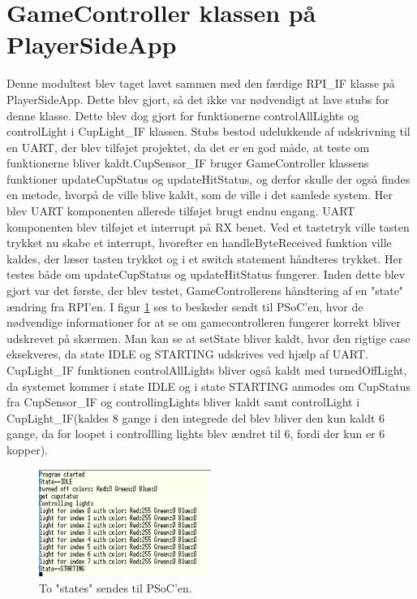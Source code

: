 \documentclass[Modultest/Modultest_main.tex]{subfiles}
\begin{document}
\section{GameController klassen på PlayerSideApp}\label{sec:GameController_modultest_bilag}
Denne modultest blev taget lavet sammen med den færdige RPI\_IF klasse på PlayerSideApp. Dette blev gjort, så det ikke var nødvendigt at lave stubs for denne klasse. Dette blev dog gjort for funktionerne controlAllLights og controlLight i CupLight\_IF klassen. Stubs bestod udelukkende af udskrivning til en UART, der blev tilføjet projektet, da det er en god måde, at teste om funktionerne bliver kaldt.CupSensor\_IF bruger GameController klassens funktioner updateCupStatus og updateHitStatus, og derfor skulle der også findes en metode, hvorpå de ville blive kaldt, som de ville i det samlede system. Her blev UART komponenten allerede tilføjet brugt endnu engang. UART komponenten blev tilføjet et interrupt på RX benet. Ved et tastetryk ville tasten trykket nu skabe et interrupt, hvorefter en handleByteReceived funktion ville kaldes, der læser tasten trykket og i et switch statement håndteres trykket. Her testes både om updateCupStatus og updateHitStatus fungerer. Inden dette blev gjort var det første, der blev testet, GameControllerens håndtering af en "state" ændring fra RPI'en. I figur \ref{fig:IDLE_STARTING} ses to beskeder sendt til PSoC'en, hvor de nødvendige informationer for at se om gamecontrolleren fungerer korrekt bliver udskrevet på skærmen. Man kan se at setState bliver kaldt, hvor den rigtige case eksekveres, da state IDLE og STARTING udskrives ved hjælp af UART. CupLight\_IF funktionen controlAllLights bliver også kaldt med turnedOffLight, da systemet kommer i state IDLE og i state STARTING anmodes om CupStatus fra CupSensor\_IF og controllingLights bliver kaldt samt controlLight i CupLight\_IF(kaldes 8 gange i den integrede del blev bliver den kun kaldt 6 gange, da for loopet i controllling lights blev ændret til 6, fordi der kun er 6 kopper).
\begin{figure}[H]
    \centering
    \includegraphics[width=0.5\textwidth]{Modultest/playerside_GameController/graphics/IDLE_STARTING.PNG}
    \caption{To "states" sendes til PSoC'en.}
    \label{fig:IDLE_STARTING}
\end{figure}
\end{document}
